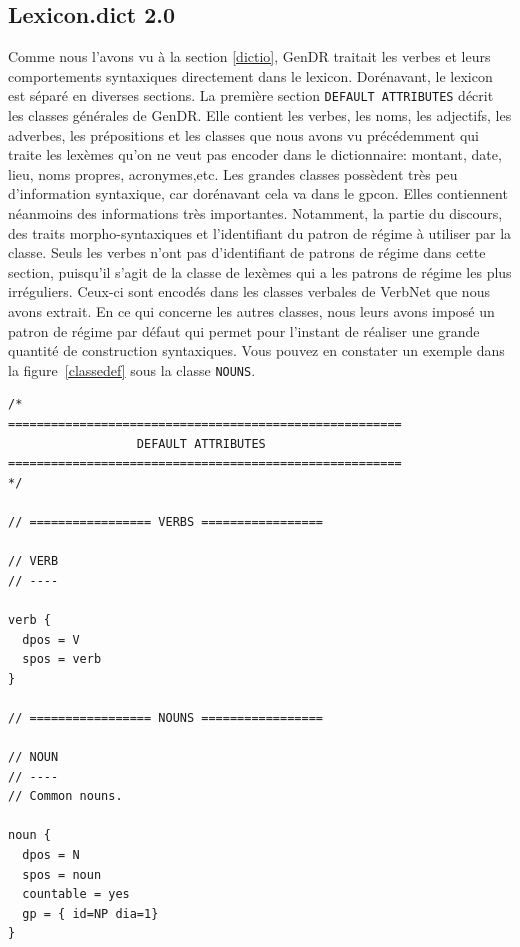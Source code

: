 \subsection{Lexicon.dict 2.0}
Comme nous l'avons vu à la section \ref{dictio}, GenDR traitait les verbes et leurs comportements syntaxiques directement dans le lexicon. Dorénavant, le lexicon est séparé en diverses sections. La première section \texttt{DEFAULT ATTRIBUTES} décrit les classes générales de GenDR. Elle contient les verbes, les noms, les adjectifs, les adverbes, les prépositions et les classes que nous avons vu précédemment qui traite les lexèmes qu'on ne veut pas encoder dans le dictionnaire: montant, date, lieu, noms propres, acronymes,etc. Les grandes classes possèdent très peu d'information syntaxique, car dorénavant cela va dans le gpcon. Elles contiennent néanmoins des informations très importantes. Notamment, la partie du discours, des traits morpho-syntaxiques et l'identifiant du patron de régime à utiliser par la classe. Seuls les verbes n'ont pas d'identifiant de patrons de régime dans cette section, puisqu'il s'agit de la classe de lexèmes qui a les patrons de régime les plus irréguliers. Ceux-ci sont encodés dans les classes verbales de VerbNet que nous avons extrait. En ce qui concerne les autres classes, nous leurs avons imposé un patron de régime par défaut qui permet pour l'instant de réaliser une grande quantité de construction syntaxiques. Vous pouvez en constater un exemple dans la figure~\ref{classedef} sous la classe \texttt{NOUNS}.

\begin{lstlisting}[language=XML, caption = Attributs par défaut des classes, label=classedef]
/*
=======================================================
                  DEFAULT ATTRIBUTES
=======================================================
*/

// ================= VERBS =================

// VERB
// ----

verb {
  dpos = V
  spos = verb
}

// ================= NOUNS =================

// NOUN
// ----
// Common nouns.

noun {
  dpos = N
  spos = noun
  countable = yes
  gp = { id=NP dia=1}
}
\end{lstlisting}

